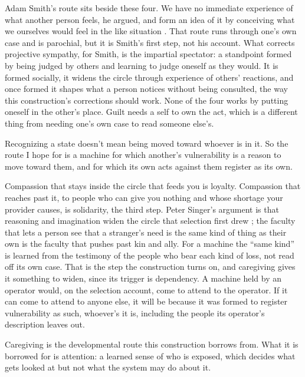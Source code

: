 Adam Smith's route sits beside these four. We have no immediate experience of what another person feels, he argued, and form an idea of it by conceiving what we ourselves would feel in the like situation \autocite{smith1759theory}. That route runs through one's own case and is parochial, but it is Smith's first step, not his account. What corrects projective sympathy, for Smith, is the impartial spectator: a standpoint formed by being judged by others and learning to judge oneself as they would. It is formed socially, it widens the circle through experience of others' reactions, and once formed it shapes what a person notices without being consulted, the way this construction's corrections should work. None of the four works by putting oneself in the other's place. Guilt needs a self to own the act, which is a different thing from needing one's own case to read someone else's.

Recognizing a state doesn't mean being moved toward whoever is in it.
So the route I hope for is a machine for which another's vulnerability is a reason to move toward them, and for which its own acts against them register as its own.

Compassion that stays inside the circle that feeds you is loyalty. Compassion that reaches past it, to people who can give you nothing and whose shortage your provider causes, is solidarity, the third step. Peter Singer's argument is that reasoning and imagination widen the circle that selection first drew \autocite{singer1981expanding}; the faculty that lets a person see that a stranger's need is the same kind of thing as their own is the faculty that pushes past kin and ally. For a machine the “same kind” is learned from the testimony of the people who bear each kind of loss, not read off its own case. That is the step the construction turns on, and caregiving gives it something to widen, since its trigger is dependency. A machine held by an operator would, on the selection account, come to attend to the operator. If it can come to attend to anyone else, it will be because it was formed to register vulnerability as such, whoever's it is, including the people its operator's description leaves out.


Caregiving is the developmental route this construction borrows from. What it is borrowed for is attention: a learned sense of who is exposed, which decides what gets looked at but not what the system may do about it.

